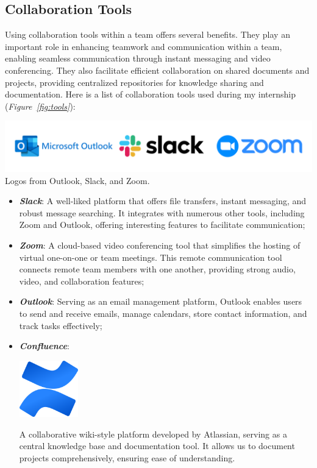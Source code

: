 \subsection{Collaboration Tools}
Using collaboration tools within a team offers several benefits. They play an important role in enhancing teamwork and communication within a team, enabling seamless communication through instant messaging and video conferencing. They also facilitate efficient collaboration on shared documents and projects, providing centralized repositories for knowledge sharing and documentation. Here is a list of collaboration tools used during my internship (\textit{Figure~\ref{fig:tools}}):
\begin{center}
    \centering
    \includegraphics[width=\textwidth]{Images/tools.png}
    Logos from Outlook\cite{Outlook}, Slack\cite{slack}, and Zoom\cite{zoom}.
    \label{fig:tools}
\end{center}
\begin{itemize}
    \item \textbf{\textit{Slack}}: A well-liked platform that offers file transfers, instant messaging, and robust message searching. It integrates with numerous other tools, including Zoom and Outlook, offering interesting features to facilitate communication;
    \item \textbf{\textit{Zoom}}: A cloud-based video conferencing tool that simplifies the  hosting of virtual one-on-one or team meetings. This remote communication tool connects remote team members with one another, providing strong audio, video, and collaboration features;
    \item \textbf{\textit{Outlook}}: Serving as an email management platform, Outlook enables users to send and receive emails, manage calendars, store contact information, and track tasks effectively;
    \item \textbf{\textit{Confluence}}:
          \begin{center}
              \centering
              \includegraphics[width=0.2\textwidth]{Images/confluence_logo.png}
               \cite{Confluence}
              \label{fig:confluence}
          \end{center}
          A collaborative wiki-style platform developed by Atlassian, serving as a central knowledge base and documentation tool. It allows us to document projects comprehensively, ensuring ease of understanding.
\end{itemize}

